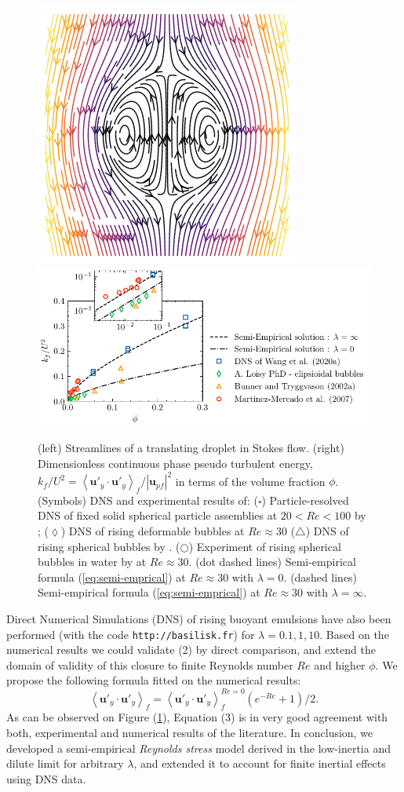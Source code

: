 \documentclass[12pt,a4paper]{article}
\newcommand{\avg}[1]{\left<#1\right>}
\renewcommand{\avg}[1]{\left<#1\right>}
\begin{document}
\begin{figure}[h!]
    \centering
    \includegraphics[height=0.25\textwidth]{image/Rising_Stokes.png}
    \includegraphics[height=0.3\textwidth]{image/HOMOGENEOUS_final/CA/KFliterature.pdf}
    \caption{\small
        (left) Streamlines of a translating droplet in Stokes flow. 
            (right) Dimensionless continuous phase pseudo turbulent energy, $k_f/U^2 = \avg{\textbf{u}'_y\cdot\textbf{u}'_y}_f/ |\textbf{u}_{pf}|^2$ in terms of the volume fraction $\phi$.
            (Symbols) DNS and experimental results of: 
            ($\pmb\square$)  Particle-resolved DNS
            of fixed solid spherical particle assemblies at $20< Re < 100$  by \cite{wang2021numerical}; 
            ($\pmb\lozenge$) DNS of rising deformable bubbles at $Re \approx 30$ \cite{loisy2016direct}
            ($\pmb\triangle$) DNS of rising spherical bubbles by \cite{bunner2002dynamics}. 
            ($\pmb\bigcirc$) Experiment of rising spherical bubbles in water by \cite{martinez2007measurement} at $Re \approx 30$. 
            (dot dashed lines) Semi-empirical formula (\ref{eq:semi-emprical}) at $Re \approx 30$ with $\lambda = 0$. 
            (dashed lines)  Semi-empirical formula (\ref{eq:semi-emprical}) at $Re \approx 30$ with $\lambda = \infty$.
            }
    \label{fig:wake}
\end{figure}

Direct Numerical Simulations (DNS) of rising buoyant emulsions have also been performed (with the code \texttt{http://basilisk.fr}) for $\lambda = 0.1,1,10$. 
Based on the numerical results we could validate (2) by direct comparison, and extend the domain of validity of this closure to finite Reynolds number $Re$ and higher $\phi$. 
We propose the following formula fitted on the numerical results: 
\begin{equation}
    \avg{\textbf{u}'_y\cdot \textbf{u}'_y}_f
    =
    \avg{\textbf{u}'_y\cdot \textbf{u}'_y}_f^{Re = 0}
    \left(e^{-Re} +1\right)/2. 
    \label{eq:semi-emprical}
\end{equation}
As can be observed on Figure (\ref{fig:wake}), Equation (3) is in very good agreement with both, experimental and numerical results of the literature.  
In conclusion, we developed a semi-empirical \textit{Reynolds stress} model derived in the low-inertia and dilute limit for arbitrary $\lambda$, and extended it to account for finite inertial effects using DNS data.

 



\end{document}
